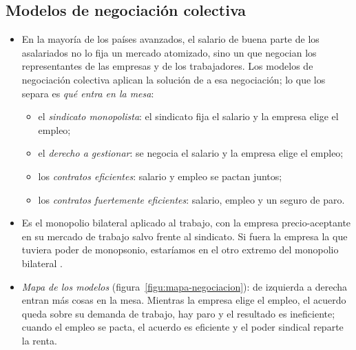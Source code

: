 \documentclass[11pt]{article}
\begin{document}
\subsection{Modelos de negociación colectiva}\label{sec:negociacion-colectiva}

\begin{itemize}
\item En la mayoría de los países avanzados, el salario de buena parte de los asalariados no lo fija un mercado atomizado, sino un  que negocian los representantes de las empresas y de los trabajadores. Los modelos de negociación colectiva aplican la solución de  a esa negociación; lo que los separa es \emph{qué entra en la mesa}:
  \begin{itemize}
  \item el \emph{sindicato monopolista}\nocite{Dunlop1944Wage}: el sindicato fija el salario y la empresa elige el empleo;
  \item el \emph{derecho a gestionar}\nocite{Leontief1946Pure,NickellAndrews1983Unions}: se negocia el salario y la empresa elige el empleo;
  \item los \emph{contratos eficientes}\nocite{McDonaldSolow1981Wage}: salario y empleo se pactan juntos;
  \item los \emph{contratos fuertemente eficientes}\nocite{Booth1995Layoffs}: salario, empleo y un seguro de paro.
  \end{itemize}
\item Es el monopolio bilateral aplicado al trabajo, con la empresa precio-aceptante en su mercado de trabajo salvo frente al sindicato. Si fuera la empresa la que tuviera poder de monopsonio, estaríamos en el otro extremo del monopolio bilateral .
\item \emph{Mapa de los modelos} (figura~\ref{figu:mapa-negociacion}): de izquierda a derecha entran más cosas en la mesa. Mientras la empresa elige el empleo, el acuerdo queda sobre su demanda de trabajo, hay paro y el resultado es ineficiente; cuando el empleo se pacta, el acuerdo es eficiente y el poder sindical reparte la renta.
\end{itemize}

\begin{infografia}[H]
\centering
\caption{Los modelos de negociación colectiva, de un vistazo: la herramienta y lo que entra en la mesa}\label{figu:mapa-negociacion}
\end{infografia}
\end{document}
